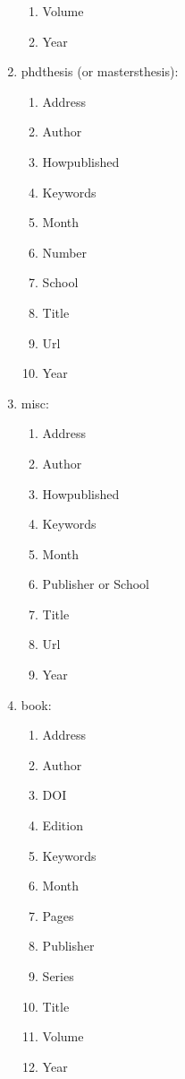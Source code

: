 \documentclass[letter,12pt]{article}
\begin{document}
\begin{enumerate}
\begin{enumerate}
	\item Volume
	\item Year
	\end{enumerate}
\item phdthesis (or mastersthesis): \vspace{-0.3cm}
	\begin{enumerate} \itemsep -2pt
	\item Address
	\item Author
	\item Howpublished
	\item Keywords
	\item Month
	\item Number
	\item School
	\item Title
	\item Url
	\item Year
	\end{enumerate}
\item misc: \vspace{-0.3cm}
	\begin{enumerate} \itemsep -2pt
	\item Address
	\item Author
	\item Howpublished
	\item Keywords
	\item Month
	\item Publisher or School
	\item Title
	\item Url
	\item Year
	\end{enumerate}
\item book: \vspace{-0.3cm}
	\begin{enumerate} \itemsep -2pt
	\item Address
	\item Author
	\item DOI
	\item Edition
	\item Keywords
	\item Month
	\item Pages
	\item Publisher
	\item Series
	\item Title
	\item Volume
	\item Year
	\end{enumerate}
\end{enumerate}
\end{document}
